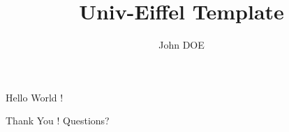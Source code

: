 \documentclass[aspectratio=169]{beamer}
\title{Univ-Eiffel Template}
\author{John DOE}
\institute{Université Gustave Eiffel, INRIA, COSYS/SII, I4S, France}
\begin{document}
	\maketitle

	\begin{frame}{Hello}
		World !
	\end{frame}

	\begin{frame}[standout]{Thank You !}
		Questions?
	\end{frame}
\end{document}
